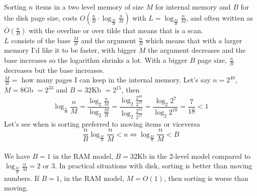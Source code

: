 \documentclass[10pt]{report}
\begin{document}
Sorting $n$ items in a two level memory of size $M$ for internal memory and $B$ for the disk page size, costs $O(\frac{n}{B} \cdot \log_{\frac{M}{B}} \frac{n}{M})$ with $L = \log_{\frac{M}{B}} \frac{n}{M}$, and often written as $\overline{O}(\frac{n}{B})$ with the overline or over tilde that means that is a scan.\\
$L$ consists of the base $\frac{M}{B}$ and the argument $\frac{n}{B}$ which means that with a larger memory I'd like it to be faster, with bigger $M$ the argument decreases and the base increases so the logarithm shrinks a lot. With a bigger $B$ page size, $\frac{n}{B}$ decreases but the base increases.\\
$\frac{M}{B} =$ how many pages I can keep in the internal memory. Let's say $n = 2^{40}$, $M = 8$Gb $= 2^{33}$ and $B = 32$Kb $= 2^{15}$, then $$\log_{\frac{n}{B}} \frac{n}{M} = \frac{\log_2\frac{n}{M}}{\log_2 \frac{M}{B}} = \frac{\log_2 \frac{2^{40}}{2^{33}}}{\log_2 \frac{2^{33}}{2^{15}}} = \frac{\log_2 2^7}{\log_2 2^{18}} = \frac{7}{18} < 1$$
Let's see when is sorting preferred to moving items or viceversa
$$\frac{n}{B} \log_{\frac{M}{B}} \frac{n}{M} < n \Leftrightarrow \log_{\frac{M}{B}} \frac{n}{M} < B$$\\
We have $B = 1$ in the RAM model, $B = 32$Kb in the 2-level model compared to $\log_{\frac{M}{B}}\frac{n}{M} = 2$ or $3$. In practical situations with disk, sorting is better than moving numbers. If $B = 1$, in the RAM model, $M = O(1)$, then sorting is worse than moving.
\end{document}
